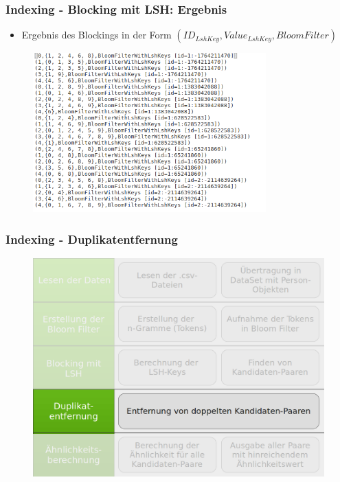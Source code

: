 \documentclass{beamer}
\begin{document}
    \begin{frame}
    		\frametitle{Indexing - Blocking mit LSH: Ergebnis}
    		\begin{itemize}
    			\item Ergebnis des Blockings in der Form $(ID_{LshKey}, Value_{LshKey},
    			 BloomFilter)$
    		\end{itemize}
    		\begin{figure}[H]
    			\includegraphics[width=0.8\textwidth]{graphics/lsh.png}
    		\end{figure}
    \end{frame}
    
    \begin{frame}
    		\frametitle{Indexing - Duplikatentfernung}
    		\begin{figure}[H]
    			\includegraphics[width=\textwidth]{graphics/process_4.png}
    		\end{figure}
    \end{frame}
    
\end{document}
